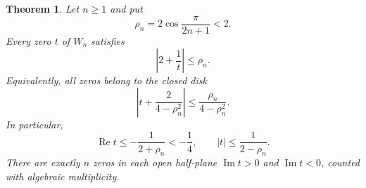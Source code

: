 \documentclass[11pt]{article}
\numberwithin{equation}{section}
\newtheorem{theorem}{Theorem}[section]
\theoremstyle{definition}
\newcommand{\Repart}{\operatorname{Re}}
\newcommand{\Impart}{\operatorname{Im}}
\begin{document}
\begin{theorem}\label{thm:enclosure}
Let $n\geq1$ and put
\[
 \rho_n=2\cos\frac{\pi}{2n+1}<2.
\]
Every zero $t$ of $W_n$ satisfies
\begin{equation}\label{eq:sdisk}
 \left|2+\frac1t\right|\leq\rho_n.
\end{equation}
Equivalently, all zeros belong to the closed disk
\begin{equation}\label{eq:tdisk}
 \left|t+\frac{2}{4-\rho_n^2}\right|
       \leq\frac{\rho_n}{4-\rho_n^2}.
\end{equation}
In particular,
\begin{equation}\label{eq:halfplane}
 \boxed{\quad \Repart t\leq-\frac1{2+\rho_n}<-\frac14,\qquad
 |t|\leq\frac1{2-\rho_n}.\quad}
\end{equation}
There are exactly $n$ zeros in each open half-plane $\Impart t>0$ and
$\Impart t<0$, counted with algebraic multiplicity.
\end{theorem}
\end{document}
